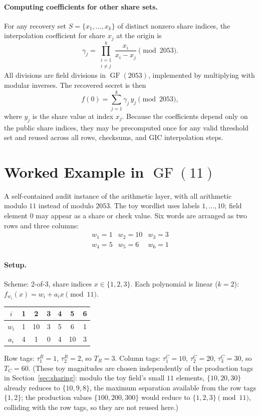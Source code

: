 \documentclass[11pt]{article}
\newcommand{\GF}{\operatorname{GF}}
\begin{document}
\paragraph{Computing coefficients for other share sets.}
For any recovery set $S = \{x_1, \ldots, x_k\}$ of distinct nonzero share indices, the interpolation coefficient for share $x_j$ at the origin is
\[
\gamma_j = \prod_{\substack{i=1 \\ i \neq j}}^{k} \frac{x_i}{x_i - x_j} \pmod{2053}.
\]
All divisions are field divisions in $\GF(2053)$, implemented by multiplying with modular inverses. The recovered secret is then
\[
f(0) = \sum_{j=1}^{k} \gamma_j \, y_j \pmod{2053},
\]
where $y_j$ is the share value at index $x_j$. Because the coefficients depend only on the public share indices, they may be precomputed once for any valid threshold set and reused across all rows, checksums, and GIC interpolation steps.

\section{\texorpdfstring{Worked Example in $\GF(11)$}{Worked Example in GF(11)}}
\label{sec:example}

A self-contained audit instance of the arithmetic layer, with all arithmetic modulo $11$ instead of modulo $2053$. The toy wordlist uses labels $1,\ldots,10$; field element $0$ may appear as a share or check value. Six words are arranged as two rows and three columns:
\[
\begin{array}{ccc}
w_1 = 1 & w_2 = 10 & w_3 = 3 \\
w_4 = 5 & w_5 = 6 & w_6 = 1
\end{array}
\]

\paragraph{Setup.} Scheme: 2-of-3, share indices $x \in \{1,2,3\}$. Each polynomial is linear ($k=2$): $f_{w_i}(x)=w_i+a_i x\pmod{11}$.
\begin{center}
\small
\begin{tabular}{@{}ccccccc@{}}
\toprule
$i$ & 1 & 2 & 3 & 4 & 5 & 6 \\ \midrule
$w_i$ & 1 & 10 & 3 & 5 & 6 & 1 \\
$a_i$ & 4 & 1 & 0 & 4 & 10 & 3 \\
\bottomrule
\end{tabular}
\end{center}
Row tags: $\tau^R_1=1$, $\tau^R_2=2$, so $T_R=3$. Column tags: $\tau^C_1=10$, $\tau^C_2=20$, $\tau^C_3=30$, so $T_C=60$. (These toy magnitudes are chosen independently of the production tags in Section~\ref{sec:sharing}: modulo the toy field's small $11$ elements, $\{10,20,30\}$ already reduces to $\{10,9,8\}$, the maximum separation available from the row tags $\{1,2\}$; the production values $\{100,200,300\}$ would reduce to $\{1,2,3\} \pmod{11}$, colliding with the row tags, so they are not reused here.)
\end{document}
